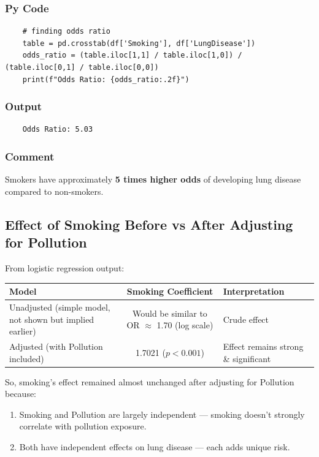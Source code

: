 \documentclass[a4paper,12pt]{article}
\begin{document}
\subsubsection{Py Code}
\begin{lstlisting}
	# finding odds ratio
	table = pd.crosstab(df['Smoking'], df['LungDisease'])
	odds_ratio = (table.iloc[1,1] / table.iloc[1,0]) / (table.iloc[0,1] / table.iloc[0,0])
	print(f"Odds Ratio: {odds_ratio:.2f}")
\end{lstlisting}

\subsubsection{Output}
\begin{verbatim}
	Odds Ratio: 5.03
\end{verbatim}

\subsubsection{Comment}
Smokers have approximately \textbf{5 times higher odds} of developing lung disease compared to non-smokers.
\subsection{Effect of Smoking Before vs After Adjusting for Pollution}

From logistic regression output:

\begin{center}
	\begin{tabular}{|l|c|l|}
		\hline
		\textbf{Model} & \textbf{Smoking Coefficient} & \textbf{Interpretation} \\
		\hline
		Unadjusted (simple model, not shown but implied earlier) & Would be similar to OR $\approx$ 1.70 (log scale) & Crude effect \\
		\hline
		Adjusted (with Pollution included) & 1.7021 ($p < 0.001$) & Effect remains strong \& significant \\
		\hline
	\end{tabular}
\end{center}

\vspace{1em}

So, smoking's effect remained almost unchanged after adjusting for Pollution because:
\begin{enumerate}
	\item Smoking and Pollution are largely independent — smoking doesn't strongly correlate with pollution exposure.
	\item Both have independent effects on lung disease — each adds unique risk.
\end{enumerate}
\end{document}
